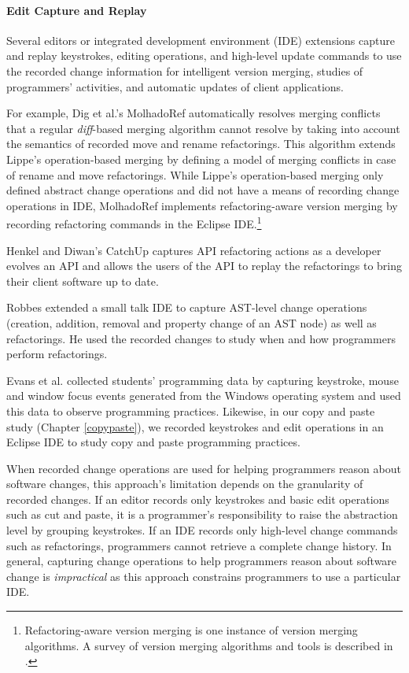 \documentclass[runningheads,a4paper]{llncs}
\begin{document}
\paragraph{Edit Capture and Replay} 
Several editors or integrated development environment (IDE) extensions capture and replay keystrokes, editing operations, and high-level update commands to use the recorded change information for intelligent version merging, studies of programmers' activities, and automatic updates of client applications. 

For example, Dig et al.'s MolhadoRef \cite{Dig2007} automatically resolves merging conflicts that a regular {\it diff}-based merging algorithm cannot resolve by taking into account the semantics of recorded move and rename refactorings. This algorithm extends Lippe's operation-based merging \cite{Lippe1992} by defining a model of merging conflicts in case of rename and move refactorings. While Lippe's operation-based merging only defined abstract change operations and did not have a means of recording change operations in IDE, MolhadoRef implements refactoring-aware version merging by recording refactoring commands in the Eclipse IDE.\footnote{Refactoring-aware version merging is one instance of version merging algorithms. A survey of version merging algorithms and tools is described in \cite{Mens2002}.}

Henkel and Diwan's CatchUp \cite{Henkel2005} captures API refactoring actions as a developer evolves an API and allows the users of the API to replay the refactorings to bring their client software up to date. 

Robbes \cite{Robbes2007} extended a small talk IDE to capture AST-level change operations (creation, addition, removal and property change of an AST node) as well as refactorings. He used the recorded changes to study when and how programmers perform refactorings. 

Evans et al. \cite{Evans2003} collected students' programming data by capturing keystroke, mouse and window focus events generated from the Windows operating system and used this data to observe programming practices. Likewise, in our copy and paste study (Chapter \ref{copypaste}), we recorded keystrokes and edit operations in an Eclipse IDE to study copy and paste programming practices. 

When recorded change operations are used for helping programmers reason about software changes, this approach's limitation depends on the granularity of recorded changes. If an editor records only keystrokes and basic edit operations such as cut and paste, it is a programmer's responsibility to raise the abstraction level by grouping keystrokes. If an IDE records only high-level change commands such as refactorings, programmers cannot retrieve a complete change history. 
In general, capturing change operations to help programmers reason about software change is {\it impractical} as this approach constrains programmers to use a particular IDE. 
\end{document}

